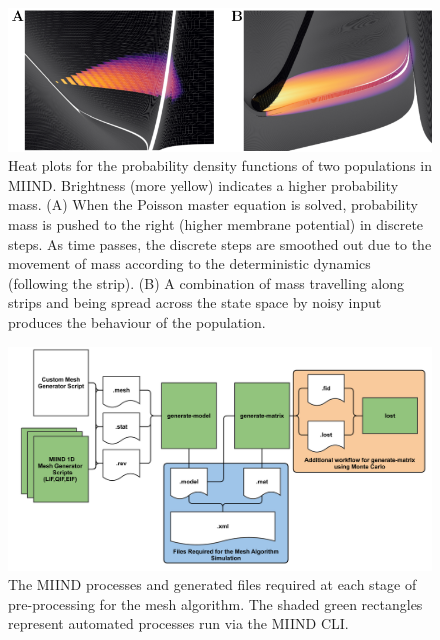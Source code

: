 \documentclass[utf8]{frontiersSCNS} %
\begin{document}
\begin{figure}[tb!]
  \centering
    \includegraphics[width=\linewidth]{images/density_full_figure.pdf}
  \caption{Heat plots for the probability density functions of two populations in MIIND. Brightness (more yellow) indicates a higher probability mass. (A) When the Poisson master equation is solved, probability mass is pushed to the right (higher membrane potential) in discrete steps. As time passes, the discrete steps are smoothed out due to the movement of mass according to the deterministic dynamics (following the strip). (B) A combination of mass travelling along strips and being spread across the state space by noisy input produces the behaviour of the population.}
  \label{fig:desities}
\end{figure}

\begin{figure}[!htb]
\centering
    \includegraphics[width=\linewidth]{images/mesh_workflow.pdf}
  \caption{The MIIND processes and generated files required at each stage of pre-processing for the mesh algorithm. The shaded green rectangles represent automated processes run via the MIIND CLI.}
  \label{fig:meshworkflow}
\end{figure}
\end{document}
